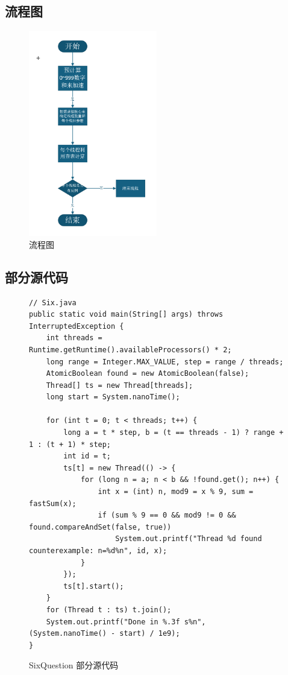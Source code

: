 \documentclass[12pt,a4paper]{article}
\begin{document}
\subsection*{流程图}

\begin{figure}[H]
\centering
\includegraphics[width=0.5\textwidth]{six1.png}
\caption{流程图}
\end{figure}

\subsection*{部分源代码}
\begin{figure}[H]
\centering
\begin{lstlisting}
// Six.java
public static void main(String[] args) throws InterruptedException {
    int threads = Runtime.getRuntime().availableProcessors() * 2;
    long range = Integer.MAX_VALUE, step = range / threads;
    AtomicBoolean found = new AtomicBoolean(false);
    Thread[] ts = new Thread[threads];
    long start = System.nanoTime();

    for (int t = 0; t < threads; t++) {
        long a = t * step, b = (t == threads - 1) ? range + 1 : (t + 1) * step;
        int id = t;
        ts[t] = new Thread(() -> {
            for (long n = a; n < b && !found.get(); n++) {
                int x = (int) n, mod9 = x % 9, sum = fastSum(x);
                if (sum % 9 == 0 && mod9 != 0 && found.compareAndSet(false, true))
                    System.out.printf("Thread %d found counterexample: n=%d%n", id, x);
            }
        });
        ts[t].start();
    }
    for (Thread t : ts) t.join();
    System.out.printf("Done in %.3f s%n", (System.nanoTime() - start) / 1e9);
}

\end{lstlisting}

\caption{SixQuestion 部分源代码}
\end{figure}
\end{document}
